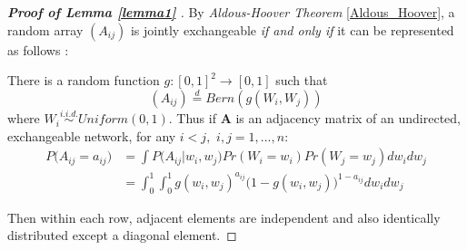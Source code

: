 \documentclass[12pt]{article}
\theoremstyle{definition}
\begin{document}
\begin{proof}[\textbf{Proof of Lemma \ref{lemma1} }] 
	By \textit{Aldous-Hoover Theorem} \ref{Aldous_Hoover}, a random array $(A_{ij})$ is jointly exchangeable \textit{if and only if} it can be represented as follows : 
		
	There is a random function $g : [0,1]^2 \rightarrow [0,1]$ such that 
\begin{equation}
(A_{ij})  \stackrel{d}{=} Bern( g(W_{i}, W_{j}))
\end{equation}
where $W_{i} \overset{i.i.d.}{\sim} Uniform(0,1)$. Thus if $\mathbf{A}$ is an adjacency matrix of an undirected, exchangeable network, for any $i < j,$ $i,j = 1,... , n$:
\begin{equation}
\begin{split}
	P \big(  A_{ij} = a_{ij} \big) & = \int P \big( A_{ij} \big| w_{i}, w_{j} \big) Pr(W_{i} = w_{i}) Pr(W_{j} = w_{j}) dw_{i} dw_{j} \\ & = \int_{0}^{1} \int_{0}^{1} g( w_{i},  w_{j})^{a_{ij}} \big( 1- g( w_{i},  w_{j}) \big)^{1-a_{ij}} dw_{i} dw_{j} 
\end{split}
\end{equation}
		
Then within each row, adjacent elements are independent and also identically distributed except a diagonal element.

\end{proof}
	
\end{document}

